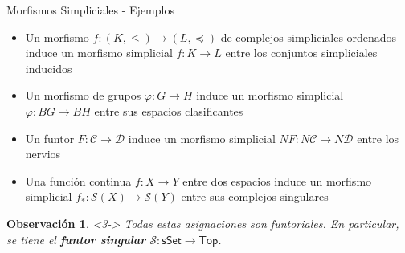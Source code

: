 \documentclass[11pt]{beamer}
\newcommand{\cat}[1]{\mathsf{#1}}
\newtheorem{defs}{Definición}
\newtheorem{obs}{Observación}
\begin{document}
\begin{frame}{Morfismos Simpliciales - Ejemplos}
\begin{itemize}
\item <1-> Un morfismo $f \colon (K,\leq) \to (L,\preceq)$ de complejos simpliciales ordenados induce un morfismo simplicial $f : K \to L$ entre los conjuntos simpliciales inducidos %
\item <2-> Un morfismo de grupos $\varphi : G \to H$ induce un morfismo simplicial $\varphi : BG \to BH$ entre sus espacios clasificantes %
\item <2-> Un funtor $F : \mathscr{C} \to \mathscr{D}$ induce un morfismo simplicial $NF : N\mathscr{C} \to N\mathscr{D}$ entre los nervios
\item <3-> Una función continua $f : X \to Y$ entre dos espacios induce un morfismo simplicial $f_* : \mathscr{S}(X) \to \mathscr{S}(Y)$ entre sus complejos singulares
\end{itemize}
\begin{obs}<3-> Todas estas asignaciones son funtoriales. En particular, se tiene el \textbf{funtor singular} $\mathscr{S} : \cat{sSet} \to \cat{Top}$.
\end{obs}
\end{frame}

%
%
\end{document}
